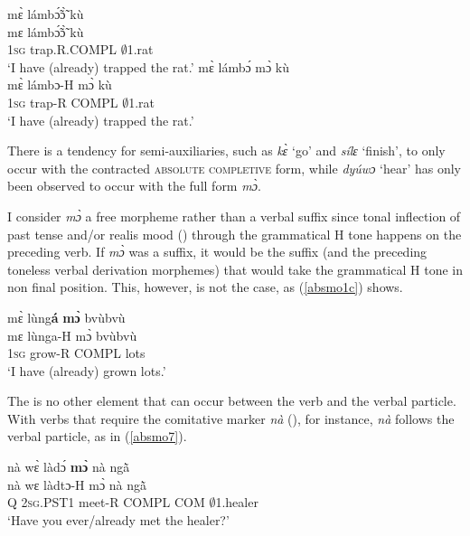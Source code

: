 \begin{exe} 
\ex\label{absmo2}
\begin{xlist} 
\ex\label{absmo2a}
  \glll    mɛ̀ lámbɔ̃́ɔ̃̀ kù  \\
           mɛ lámbɔ̃́ɔ̃̀ kù  \\
             1\textsc{sg}  trap.R.COMPL $\emptyset$1.rat  \\
    \trans `I have (already) trapped the rat.'
\ex\label{absmo2b}
  \glll    *mɛ̀ lámbɔ́ mɔ̀ kù \\
          mɛ̀ lámbɔ-H mɔ̀ kù \\
             1\textsc{sg} trap-R COMPL $\emptyset$1.rat    \\
    \trans `I have (already) trapped the rat.'
\end{xlist}
\end{exe}

\noindent There is a tendency for semi-auxiliaries, such as {\itshape kɛ̀} `go' and {\itshape sílɛ} `finish', to only occur with  the contracted \textsc{absolute completive} form, while {\itshape dyúwɔ} `hear' has only been observed to occur with the full form {\itshape mɔ̀}.

I consider {\itshape mɔ̀} a free morpheme rather than a verbal suffix since  tonal inflection of past tense and/or realis mood () through the grammatical H tone happens on the preceding verb. If {\itshape mɔ̀} was a suffix, it would be the suffix (and the preceding toneless verbal derivation morphemes) that would take the grammatical H tone in non final position. This, however, is not the case, as (\ref{absmo1c}) shows.

\begin{exe}
\ex\label{absmo1c}
  \glll    mɛ̀ lùng{\bfseries á} {\bfseries mɔ̀} bvùbvù\\
           mɛ lùnga-H mɔ̀  bvùbvù \\
             1\textsc{sg}  grow-R COMPL  lots \\
    \trans `I have (already) grown lots.'
\end{exe}

The is no other element that can occur between the verb and the verbal particle.  With verbs that require the comitative marker {\itshape nà} (), for instance, {\itshape nà} follows the verbal particle, as in (\ref{absmo7}).

\begin{exe}
\ex\label{absmo7}
  \glll     nà wɛ̀  làdɔ́ {\bfseries mɔ̀} nà ngã̀ \\
          nà wɛ  làdtɔ-H mɔ̀ nà ngã̀ \\
           Q 2\textsc{sg}.PST1  meet-R COMPL COM $\emptyset$1.healer  \\
    \trans `Have you ever/already met the healer?'
\end{exe}









